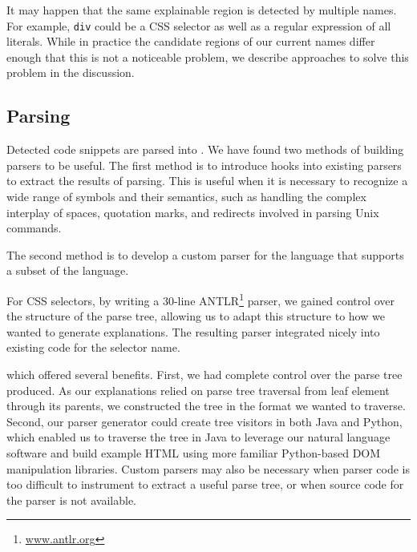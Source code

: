 \begin{changes}
It may happen that the same explainable region is detected by multiple \Glspl{name}.
For example, \texttt{div} could be a CSS selector as well as a regular expression of all literals.
While in practice the candidate regions of our current \Glspl{name} differ enough that this is not a noticeable problem, we describe approaches to solve this problem in the discussion.
\end{changes}

\subsection{Parsing}
Detected code snippets are parsed into .
We have found two methods of building parsers to be useful. The first method is to introduce hooks into existing parsers to extract the results of parsing.  This is useful 
when it is necessary to recognize a wide range of symbols and their semantics, %
such as handling the complex interplay of spaces, quotation marks, and redirects involved in parsing Unix commands.

The second method is to develop a custom parser for the language that supports a subset of the language.
\begin{changes}
For CSS selectors, by writing a 30-line ANTLR\footnote{\url{www.antlr.org}} parser, we gained control over the structure of the parse tree, allowing us to adapt this structure to how we wanted to generate explanations.
The resulting parser integrated nicely into existing code for the selector \Gls{name}.
\end{changes}
which offered several benefits.
First, we had complete control over the parse tree produced.
As our explanations relied on parse tree traversal from leaf element through its parents, we constructed the tree in the format we wanted to traverse.
Second, our parser generator could create tree visitors in both Java and Python, which enabled us to traverse the tree in Java to leverage our natural language software and build example HTML using more familiar Python-based DOM manipulation libraries.
Custom parsers may also be necessary when parser code is too difficult to instrument to extract a useful parse tree, or when source code for the parser is not available.
\fi

